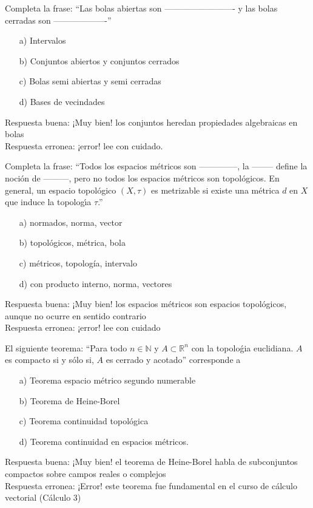 \documentclass{exam}
\begin{document}
\begin{questions}
\question Completa la frase: ``Las bolas abiertas son ------------------------- y las bolas cerradas son -------------------''

\begin{itemize}
\item[a)] Intervalos
\item[b)] Conjuntos abiertos y conjuntos cerrados
\item[c)] Bolas semi abiertas y semi cerradas
\item[d)] Bases de vecindades
\end{itemize}

Respuesta buena: ¡Muy bien! los conjuntos heredan propiedades algebraicas en bolas\\
Respuesta erronea: ¡error! lee con cuidado.


\question Completa la frase: ``Todos los espacios métricos son --------------, la -------- define la noción de ---------, pero no todos los espacios métricos son topológicos. En general, un espacio topológico $(X, \tau)$ es metrizable si existe una métrica $d$ en $X$ que induce la topologı́a $\tau$.''

\begin{itemize}
\item[a)] normados, norma, vector
\item[b)] topológicos, métrica, bola
\item[c)] métricos, topología, intervalo
\item[d)] con producto interno, norma, vectores
\end{itemize}

Respuesta buena: ¡Muy bien! los espacios métricos son espacios topológicos, aunque no ocurre en sentido contrario\\
Respuesta erronea: ¡error! lee con cuidado


\question El siguiente teorema: ``Para todo $n \in \mathbb{N}$ y $A \subset \mathbb{R}^{n}$ con la topoloǵia euclidiana. $A$ es compacto si y sólo si, $A$ es cerrado y acotado'' corresponde a

\begin{itemize}
\item[a)] Teorema espacio métrico segundo numerable
\item[b)] Teorema de Heine-Borel
\item[c)] Teorema continuidad topológica
\item[d)] Teorema continuidad en espacios métricos.
\end{itemize}

Respuesta buena: ¡Muy bien! el teorema de Heine-Borel habla de subconjuntos compactos sobre campos reales o complejos\\
Respuesta erronea: ¡Error! este teorema fue fundamental en el curso de cálculo vectorial (Cálculo 3)

\end{questions}
\end{document}
